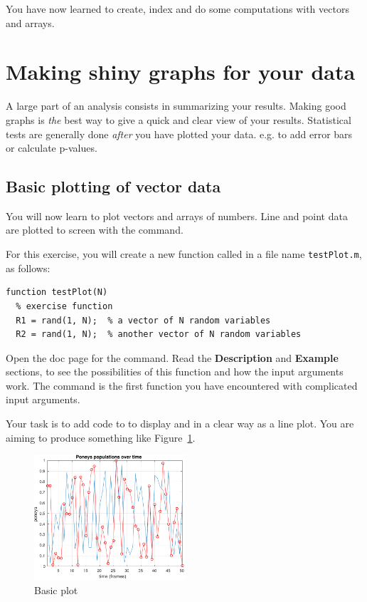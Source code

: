 \documentclass{article}
\begin{document}
You have now learned to create, index and do some computations with vectors and arrays.


\pagebreak
\section{Making shiny graphs for your data}

A large part of an analysis consists in summarizing your results.
Making good graphs is \textit{the} best way to give a quick and clear view of your results.
Statistical tests are generally done \textit{after} you have plotted your data. e.g. to add error bars or calculate p-values.


\subsection{Basic plotting of vector data}

You will now learn to plot vectors and arrays of numbers.
Line and point data are plotted to screen with the  command.

For this exercise, you will create a new function called  in a file name \verb|testPlot.m|, as follows:
\begin{lstlisting}
function testPlot(N)
  % exercise function
  R1 = rand(1, N);  % a vector of N random variables
  R2 = rand(1, N);  % another vector of N random variables
\end{lstlisting}

Open the doc page for the  command.
Read the \textbf{Description} and \textbf{Example} sections, to see the possibilities of this function and how the input arguments work.
The  command is the first function you have encountered with complicated input arguments.

Your task is to add code to  to display  and  in a clear way as a line plot.
You are aiming to produce something like Figure~\ref{fig:basic}.
\begin{figure}[h]
  \centering
  \includegraphics[width=0.5\textwidth]{basicplot.pdf}
  \caption{Basic plot}\label{fig:basic}
\end{figure}
\end{document}
